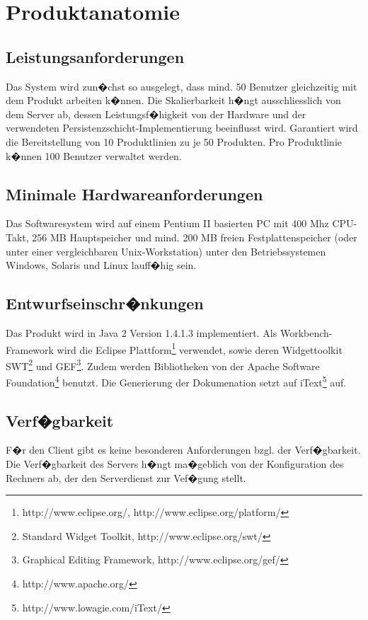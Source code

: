 \chapter{Produktanatomie}

\section{Leistungsanforderungen}
Das System wird zun�chst so ausgelegt, dass mind. 50 Benutzer gleichzeitig mit dem Produkt arbeiten k�nnen.
Die Skalierbarkeit h�ngt ausschliesslich von dem Server ab, dessen Leistungsf�higkeit von der Hardware und
der verwendeten Persistenzschicht-Implementierung beeinflusst wird. Garantiert wird die Bereitstellung von 
10 Produktlinien zu je 50 Produkten. Pro Produktlinie k�nnen 100 Benutzer verwaltet werden.

\section{Minimale Hardwareanforderungen}
Das Softwaresystem wird auf einem Pentium II basierten PC mit 400 Mhz CPU-Takt, 256 MB Hauptspeicher
und mind. 200 MB freien Festplattenspeicher (oder unter einer vergleichbaren Unix-Workstation)
unter den Betriebssystemen Windows, Solaris und Linux lauff�hig sein.

\section{Entwurfseinschr�nkungen}
Das Produkt wird in Java 2 Version 1.4.1.3 implementiert. Als Workbench-Framework wird die 
Eclipse Plattform\footnote{http://www.eclipse.org/, http://www.eclipse.org/platform/}
verwendet, sowie deren Widgettoolkit SWT\footnote{Standard Widget Toolkit, http://www.eclipse.org/swt/}
und GEF\footnote{Graphical Editing Framework, http://www.eclipse.org/gef/}.
Zudem werden Bibliotheken von der Apache Software
Foundation\footnote{http://www.apache.org/} benutzt. Die
Generierung der Dokumenation setzt auf iText\footnote{http://www.lowagie.com/iText/} auf.

\section{Verf�gbarkeit}
F�r den Client gibt es keine besonderen Anforderungen bzgl. der Verf�gbarkeit. Die Verf�gbarkeit des Servers
h�ngt ma�geblich von der Konfiguration des Rechners ab, der den Serverdienst zur Vef�gung stellt.

